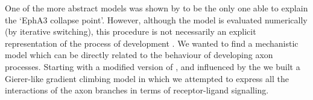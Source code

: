 \documentclass[9pt]{elife} %
\begin{document}
One of the more abstract models \citep{Triplett2011} was shown by
\cite{hjorth_quantitative_2015} to be the only one able to explain the `EphA3
collapse point'. However, although the model is evaluated numerically (by
iterative switching), this procedure is not necessarily an explicit
representation of the process of development \citep{Wilson2015}. We wanted to
find a mechanistic model which can be directly related to the behaviour of
developing axon processes. Starting with a modified version of \cite{James2020},
and influenced by the \cite{Simpson2011}
we built a Gierer-like gradient climbing model in which we attempted to
express all the interactions of the axon branches in terms of receptor-ligand
signalling.



\end{document}
